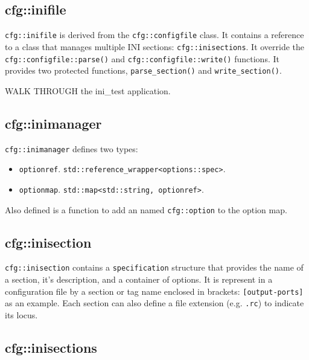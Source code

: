 \subsection{cfg::inifile}
\label{subsec:cfg_namespace_inifile}

   \texttt{cfg::inifile} is derived from the \texttt{cfg::configfile} class.
   It contains a reference to a class that manages multiple
   INI sections: \texttt{cfg::inisections}.
   It override the
   \texttt{cfg::configfile::parse()} and
   \texttt{cfg::configfile::write()} functions.
   It provides two protected functions,
   \texttt{parse\_section()} and
   \texttt{write\_section()}.

   WALK THROUGH the ini\_test application.

\subsection{cfg::inimanager}
\label{subsec:cfg_namespace_inimanager}
         
   \texttt{cfg::inimanager} defines two types:

   \begin{itemize}
      \item \texttt{optionref}.
         \texttt{std::reference\_wrapper<options::spec>}.
      \item \texttt{optionmap}.
         \texttt{std::map<std::string, optionref>}.
   \end{itemize}

   Also defined is a function to add an named \texttt{cfg::option}
   to the option map.

\subsection{cfg::inisection}
\label{subsec:cfg_namespace_inisection}

   \texttt{cfg::inisection}  contains a \texttt{specification} structure that
   provides the name of a section, it's description, and
   a container of options.
   It is represent in a configuration file by a section or tag name
   enclosed in brackets:  \texttt{[output-ports]} as an example.
   Each section can also define a file extension
   (e.g. \texttt{.rc}) to indicate its locus.

\subsection{cfg::inisections}
\label{subsec:cfg_namespace_inisections}

